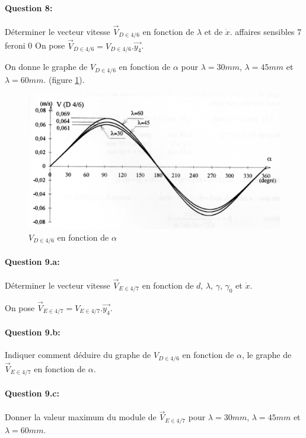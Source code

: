 \paragraph{Question 8:} Déterminer le vecteur vitesse $\vec{V}_{D\in 4/6}$ en fonction de $\lambda$ et de $\dot{x}$.
affaires sensibles 7
feroni 0
On pose $\vec{V}_{D\in 4/6}=V_{D\in 4/6}.\overrightarrow{y_4}$.

On donne le graphe de $V_{D\in 4/6}$ en fonction de $\alpha$ pour $\lambda = 30 mm$, $\lambda=45mm$ et $\lambda=60mm$. (figure \ref{commande_figure_3}).

\begin{figure}[!ht]
\begin{center}
\includegraphics[width=0.6\linewidth]{img/commande_figure_3}
\caption{$V_{D\in 4/6}$ en fonction de $\alpha$}
\label{commande_figure_3}
\end{center}
\end{figure}

\paragraph{Question 9.a:} Déterminer le vecteur vitesse $\vec{V}_{E\in 4/7}$ en fonction de $d$, $\lambda$, $\gamma$, $\gamma_0$ et $\dot{x}$.

On pose $\vec{V}_{E\in 4/7}={V}_{E\in 4/7}.\overrightarrow{y_4}$.
 
\paragraph{Question 9.b:} Indiquer comment déduire du graphe de ${V}_{D\in 4/6}$ en fonction de $\alpha$, le graphe de $\vec{V}_{E\in 4/7}$ en fonction de $\alpha$.

\paragraph{Question 9.c:} Donner la valeur maximum du module de $\vec{V}_{E\in 4/7}$ pour $\lambda=30mm$, $\lambda=45mm$ et $\lambda=60mm$.

